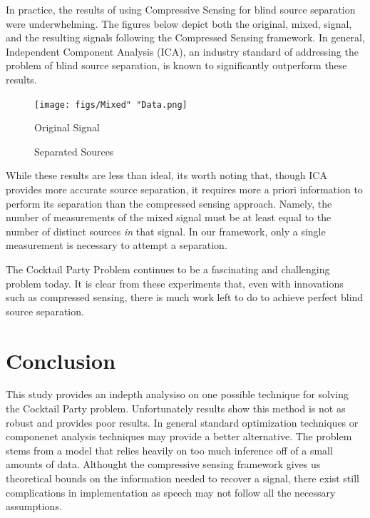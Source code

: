 \documentclass{article}
\begin{document}
In practice, the results of using Compressive Sensing for blind source separation were underwhelming. The figures below depict both the original, mixed, signal, and the resulting signals following the Compressed Sensing framework. In general, Independent Component Analysis (ICA), an industry standard of addressing the problem of blind source separation, is known to significantly outperform these results.

\begin{figure}[H]
  \centering
  \texttt{[image: figs/Mixed" "Data.png]}
  \caption{Original Signal}
\end{figure}

\begin{figure}[H]
  \centering
  \caption{Separated Sources}
\end{figure}

While these results are less than ideal, its worth noting that, though ICA provides more accurate source separation, it requires more a priori information to perform its separation than the compressed sensing approach. Namely, the number of measurements of the mixed signal must be at least equal to the number of distinct sources \textit{in} that signal. In our framework, only a single measurement is necessary to attempt a separation.

The Cocktail Party Problem continues to be a fascinating and challenging problem today. It is clear from these experiments that, even with innovations such as compressed sensing, there is much work left to do to achieve perfect blind source separation.

\section*{Conclusion}
This study provides an indepth analysiso on one possible technique for solving the Cocktail Party problem. Unfortunately results show this method is not as robust and provides poor results. In general standard optimization techniques or componenet analysis techniques may provide a better alternative. The problem stems from a model that relies heavily on too much inference off of a small amounts of data. Althought the compressive sensing framework gives us theoretical bounds on the information needed to recover a signal, there exist still complications in implementation as speech may not follow all the necessary assumptions. 
\end{document}
